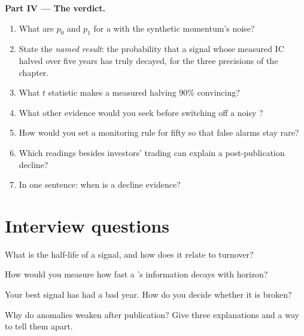 \begin{problem}
\medskip\noindent\textbf{Part IV --- The verdict.}
\begin{enumerate}[resume]
\item What are $p_0$ and $p_1$ for a  with the synthetic momentum's noise?
\item State the \emph{named result}: the probability that a signal whose measured IC halved over five years has truly decayed, for the three
precisions of the chapter.
\item What $t$ statistic makes a measured halving 90\% convincing?
\item What other evidence would you seek before switching off a noisy ?
\item How would you set a monitoring rule for fifty  so that false alarms stay rare?
\item Which readings besides investors' trading can explain a post-publication decline?
\item In one sentence: when is a decline evidence?
\end{enumerate}
\end{problem}

\section{Interview questions}

\begin{interviewq}\label{iq:rs:half-life-decay-and-stability:1}
What is the half-life of a signal, and how does it relate to turnover?
\end{interviewq}

\begin{interviewq}\label{iq:rs:half-life-decay-and-stability:2}
How would you measure how fast a 's information decays with horizon?
\end{interviewq}

\begin{interviewq}\label{iq:rs:half-life-decay-and-stability:3}
Your best signal has had a bad year. How do you decide whether it is broken?
\end{interviewq}

\begin{interviewq}\label{iq:rs:half-life-decay-and-stability:4}
Why do anomalies weaken after publication? Give three explanations and a way to tell them apart.
\end{interviewq}

